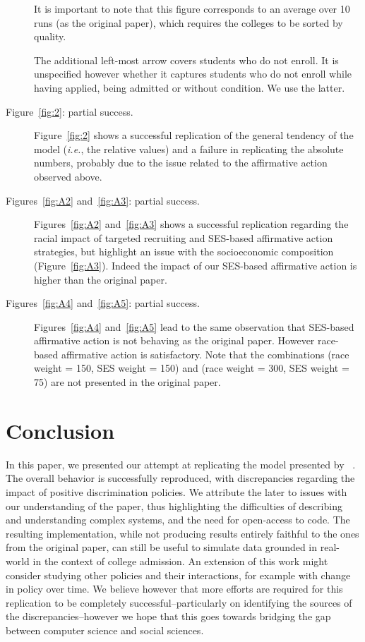 \begin{description}
It is important to note that this figure corresponds to an average over 10 runs (as the original paper), which requires the colleges to be sorted by quality. 

The additional left-most arrow covers students who do not enroll. It is unspecified however whether it captures students who do not enroll while having applied, being admitted or without condition. We use the latter.

\item[Figure~\ref{fig:2}: partial success.]  Figure~\ref{fig:2} shows a successful replication of the general tendency of the model (\emph{i.e.}, the relative values) and a failure in replicating the absolute numbers, probably due to the issue related to the affirmative action observed above.

\item[Figures~\ref{fig:A2} and~\ref{fig:A3}: partial success.] Figures~\ref{fig:A2} and~\ref{fig:A3} shows a successful replication regarding the racial impact of targeted recruiting and SES-based affirmative action strategies, but highlight an issue with the socioeconomic composition (Figure~\ref{fig:A3}). Indeed the impact of our SES-based affirmative action is higher than the original paper.

\item[Figures~\ref{fig:A4} and~\ref{fig:A5}: partial success.] Figures~\ref{fig:A4} and~\ref{fig:A5} lead to the same observation that SES-based affirmative action is not behaving as the original paper. However race-based affirmative action is satisfactory. Note that the combinations (race weight = 150, SES weight = 150) and (race weight = 300, SES weight = 75) are not presented in the original paper.

\end{description}

\section{Conclusion}

In this paper, we presented our attempt at replicating the model presented by \citeauthor{reardon2018levels}~\cite{reardon2018levels}.
The overall behavior is successfully reproduced, with discrepancies regarding the impact of positive discrimination policies.
We attribute the later to issues with our understanding of the paper, thus highlighting the difficulties of describing and understanding complex systems, and the need for open-access to code.
The resulting implementation, while not producing results entirely faithful to the ones from the original paper, can still be useful to simulate data grounded in real-world in the context of college admission.
An extension of this work might consider studying other policies and their interactions, for example with change in policy over time.
We believe however that more efforts are required for this replication to be completely successful--particularly on identifying the sources of the discrepancies--however we hope that this goes towards bridging the gap between computer science and social sciences.

